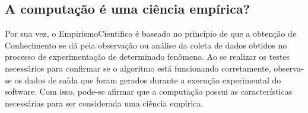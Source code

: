 \subsection{A computação é uma ciência empírica? }

Por sua vez, o \gls{EmpirismoCientifico} é baseado no princípio de que a obtenção de \gls{Conhecimento} se dá pela observação ou análise da coleta de dados obtidos no processo de experimentação de determinado fenômeno. Ao se realizar os testes necessários para confirmar se o algoritmo está funcionando corretamente, observa-se os dados de saída que foram gerados durante a execução experimental do software. Com isso, pode-se afirmar que a computação possui as características necessárias para ser considerada uma ciência empírica.